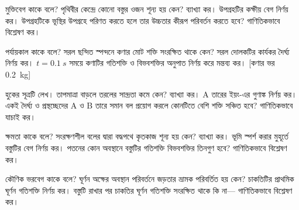 \documentclass[11pt]{article}
\begin{document}
{মুক্তিবেগ কাকে বলে?}
{পৃথিবীর কেন্দ্রে কোনো বস্তুর ওজন শূন্য হয় কেন? ব্যাখ্যা কর।}
{উপগ্রহটির কক্ষীয় বেগ নির্ণয় কর।}
{উপগ্রহটিকে ভূস্থির উপগ্রহে পরিণত করতে হলে তার উচ্চতার কীরূপ পরিবর্তন করতে হবে? গাণিতিকভাবে বিশ্লেষণ কর।}

{পর্যায়কাল কাকে বলে?}
{সরল ছন্দিত স্পন্দনে কণার মোট শক্তি সংরক্ষিত থাকে কেন?}
{সরল দোলকটির কার্যকর দৈর্ঘ্য নির্ণয় কর।}
{$t=\SI{0.1}{s}$ সময়ে কণাটির গতিশক্তি ও বিভবশক্তির অনুপাত নির্ণয় করে মন্তব্য কর। [কণার ভর \SI{0.2}{kg}]}

{হুকের সূত্রটি লেখ।}
{তাপমাত্রা বাড়লে তরলের সান্দ্রতা কমে কেন? ব্যাখ্যা কর।}
{A তারের ইয়ং-এর গুণাঙ্ক নির্ণয় কর।}
{একই দৈর্ঘ্য ও প্রস্থচ্ছেদের A ও B তারে সমান বল প্রয়োগ করলে কোনটিতে বেশি শক্তি সঞ্চিত হবে? গাণিতিকভাবে যাচাই কর।}

{ক্ষমতা কাকে বলে?}
{সংরক্ষণশীল বলের দ্বারা বদ্ধপথে কৃতকাজ শূন্য হয় কেন? ব্যাখ্যা কর।}
{ভূমি স্পর্শ করার মুহূর্তে বস্তুটির বেগ নির্ণয় কর।}
{পতনের কোন অবস্থানে বস্তুটির গতিশক্তি বিভবশক্তির তিনগুণ হবে? গাণিতিকভাবে বিশ্লেষণ কর।}

{কৌণিক ভরবেগ কাকে বলে?}
{ঘূর্ণন অক্ষের অবস্থান পরিবর্তনে জড়তার ভ্রামক পরিবর্তিত হয় কেন?}
{চাকতিটির প্রাথমিক ঘূর্ণন গতিশক্তি নির্ণয় কর।}
{বস্তুটি রাখার পর চাকতির ঘূর্ণন গতিশক্তি সংরক্ষিত থাকে কি না— গাণিতিকভাবে বিশ্লেষণ কর।}
\end{document}
